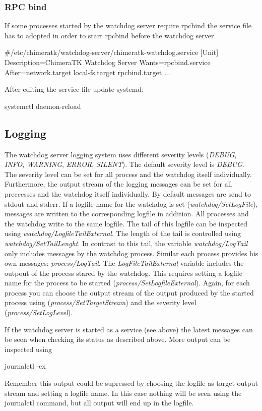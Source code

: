 \subsubsection*{R\+PC bind}

If some processes started by the watchdog server require {\ttfamily rpcbind} the service file has to adopted in order to start {\ttfamily rpcbind} before the watchdog server. \begin{DoxyVerb}#/etc/chimeratk/watchdog-server/chimeratk-watchdog.service
[Unit]
Description=ChimeraTK Watchdog Server
Wants=rpcbind.service
After=network.target local-fs.target rpcbind.target
...
\end{DoxyVerb}


After editing the service file update systemd\+: \begin{DoxyVerb}systemctl daemon-reload
\end{DoxyVerb}


\subsection*{Logging}

The watchdog server logging system uses different severity levels ({\itshape D\+E\+B\+UG}, {\itshape I\+N\+FO}, {\itshape W\+A\+R\+N\+I\+NG}, {\itshape E\+R\+R\+OR}, {\itshape S\+I\+L\+E\+NT}). The default severity level is {\itshape D\+E\+B\+UG}. The severity level can be set for all process and the watchdog itself individually. Furthermore, the output stream of the logging messages can be set for all preccesses and the watchdog itself individually. By default messages are send to stdout and stderr. If a logfile name for the watchdog is set ({\itshape watchdog/\+Set\+Log\+File}), messages are written to the corresponding logfile in addition. All processes and the watchdog write to the same logfile. The tail of this logfile can be inspected using {\itshape watchdog/\+Logfile\+Tail\+External}. The length of the tail is controlled using {\itshape watchdog/\+Set\+Tail\+Lenght}. In contrast to this tail, the variable {\itshape watchdog/\+Log\+Tail} only includes messages by the watchdog process. Similar each process provides his own messages\+: {\itshape process/\+Log\+Tail}. The {\itshape Log\+File\+Tail\+External} variable includes the outpout of the process stared by the watchdog. This requires setting a logfile name for the process to be started ({\itshape process/\+Set\+Logfile\+External}). Again, for each process you can choose the output stream of the output produced by the started process using ({\itshape process/\+Set\+Target\+Stream}) and the severity level ({\itshape process/\+Set\+Log\+Level}).

If the watchdog server is started as a service (see above) the latest messages can be seen when checking its status as described above. More output can be inspected using \begin{DoxyVerb}journalctl -ex
\end{DoxyVerb}


Remember this output could be supressed by choosing the logfile as target output stream and setting a logfile name. In this case nothing will be seen using the {\ttfamily journalctl} command, but all output will end up in the logfile. 